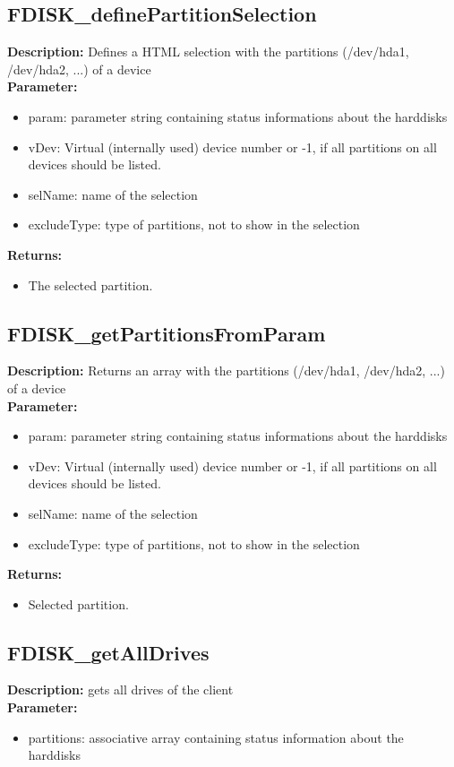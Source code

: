 \subsection{FDISK\_definePartitionSelection}
\textbf{Description:} Defines a HTML selection with the partitions (/dev/hda1, /dev/hda2, ...) of a device\\
\textbf{Parameter:}
\begin{itemize}
\item param: parameter string containing status informations about the harddisks
\item vDev: Virtual (internally used) device number or -1, if all partitions on all devices should be listed.
\item selName: name of the selection
\item excludeType: type of partitions, not to show in the selection
\end{itemize}
\textbf{Returns:}
\begin{itemize}
\item The selected partition.
\end{itemize}

\subsection{FDISK\_getPartitionsFromParam}
\textbf{Description:} Returns an array with the partitions (/dev/hda1, /dev/hda2, ...) of a device\\
\textbf{Parameter:}
\begin{itemize}
\item param: parameter string containing status informations about the harddisks
\item vDev: Virtual (internally used) device number or -1, if all partitions on all devices should be listed.
\item selName: name of the selection
\item excludeType: type of partitions, not to show in the selection
\end{itemize}
\textbf{Returns:}
\begin{itemize}
\item Selected partition.
\end{itemize}

\subsection{FDISK\_getAllDrives}
\textbf{Description:} gets all drives of the client\\
\textbf{Parameter:}
\begin{itemize}
\item partitions: associative array containing status information about the harddisks
\end{itemize}

